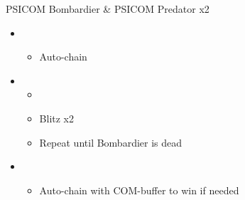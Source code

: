 \begin{multicols}{2}
\begin{battle}{PSICOM Bombardier \& PSICOM Predator x2}
\begin{itemize}
\begin{itemize}
    \end{itemize}
    \item \second
    \begin{itemize}
        \item Auto-chain
    \end{itemize}
    \item \first
    \begin{itemize}
        \item \stagger
        \item Blitz x2
        \item Repeat until Bombardier is dead
    \end{itemize}
    \item \second
    \begin{itemize}
        \item Auto-chain with COM-buffer to win if needed
    \end{itemize}
\end{itemize}
 
\end{battle}

\vfill


\end{multicols}
